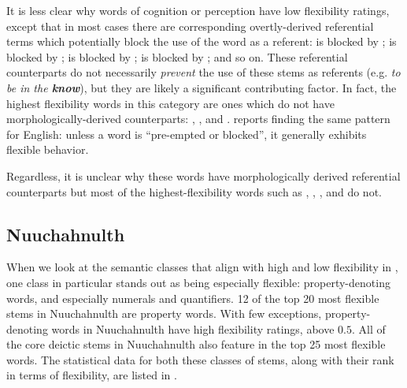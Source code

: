 It is less clear why words of cognition or perception have low flexibility ratings, except that in most cases there are corresponding overtly-derived referential terms which potentially block the use of the word as a referent:  is blocked by ;  is blocked by ;  is blocked by ;  is blocked by ; and so on. These referential counterparts do not necessarily \emph{prevent} the use of these stems as referents (e.g. \textit{to be in the \textbf{know}}), but they are likely a significant contributing factor. In fact, the highest flexibility words in this category are ones which do not have morphologically-derived counterparts: , , and . \textcite[111]{Farrell2001} reports finding the same pattern for English: unless a word is \enquote{pre-empted or blocked}, it generally exhibits flexible behavior.

Regardless, it is unclear why these words have morphologically derived referential counterparts but most of the highest-flexibility words such as , , , and  do not.

\subsection{Nuuchahnulth}
\label{sec:4.6.2}

When we look at the semantic classes that align with high and low flexibility in , one class in particular stands out as being especially flexible: property-denoting words, and especially numerals and quantifiers. 12 of the top 20 most flexible stems in Nuuchahnulth are property words. With few exceptions, property-denoting words in Nuuchahnulth have high flexibility ratings, above $0.5$. All of the core deictic stems in Nuuchahnulth also feature in the top 25 most flexible words. The statistical data for both these classes of stems, along with their rank in terms of flexibility, are listed in .

